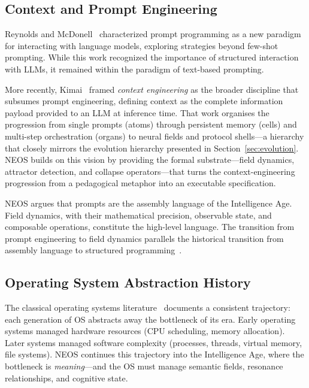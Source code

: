 \subsection{Context and Prompt Engineering}

Reynolds and McDonell~\cite{reynolds2021prompt} characterized prompt programming as a new paradigm for interacting with language models, exploring strategies beyond few-shot prompting. While this work recognized the importance of structured interaction with LLMs, it remained within the paradigm of text-based prompting.

More recently, Kimai~\cite{kimai2025context} framed \emph{context engineering} as the broader discipline that subsumes prompt engineering, defining context as the complete information payload provided to an LLM at inference time.  That work organises the progression from single prompts (atoms) through persistent memory (cells) and multi-step orchestration (organs) to neural fields and protocol shells---a hierarchy that closely mirrors the evolution hierarchy presented in Section~\ref{sec:evolution}.  NEOS builds on this vision by providing the formal substrate---field dynamics, attractor detection, and collapse operators---that turns the context-engineering progression from a pedagogical metaphor into an executable specification.

NEOS argues that prompts are the assembly language of the Intelligence Age. Field dynamics, with their mathematical precision, observable state, and composable operations, constitute the high-level language. The transition from prompt engineering to field dynamics parallels the historical transition from assembly language to structured programming~\cite{silberschatz2018operating}.

\subsection{Operating System Abstraction History}

The classical operating systems literature~\cite{silberschatz2018operating} documents a consistent trajectory: each generation of OS abstracts away the bottleneck of its era. Early operating systems managed hardware resources (CPU scheduling, memory allocation). Later systems managed software complexity (processes, threads, virtual memory, file systems). NEOS continues this trajectory into the Intelligence Age, where the bottleneck is \emph{meaning}---and the OS must manage semantic fields, resonance relationships, and cognitive state.

